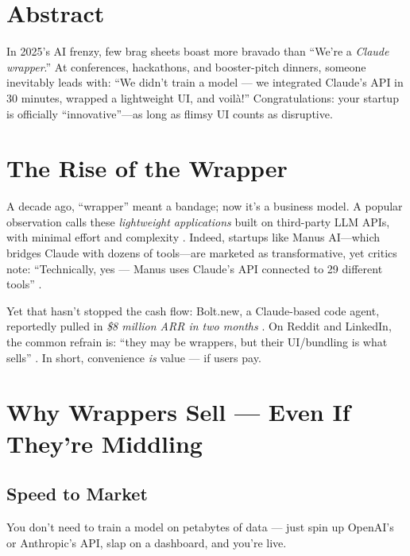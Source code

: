 




\section*{Abstract}
In 2025's AI frenzy, few brag sheets boast more bravado than ``We're a \emph{Claude wrapper}.''
At conferences, hackathons, and booster-pitch dinners, someone inevitably leads with:
``We didn't train a model --- we integrated Claude's API in 30 minutes, wrapped a lightweight UI, and voilà!''
Congratulations: your startup is officially ``innovative''---as long as flimsy UI counts as disruptive.

\section{The Rise of the Wrapper}

A decade ago, ``wrapper'' meant a bandage; now it's a business model.
A popular observation calls these \emph{lightweight applications} built on third-party LLM APIs, with minimal effort and complexity \cite{olivas2025linkedin}.
Indeed, startups like Manus AI---which bridges Claude with dozens of tools---are marketed as transformative,
yet critics note: ``Technically, yes --- Manus uses Claude's API connected to 29 different tools'' \cite{goldie2025manus}.

Yet that hasn't stopped the cash flow: Bolt.new, a Claude-based code agent, reportedly pulled in \emph{\$8 million ARR in two months} \cite{latent2025bolt}.
On Reddit and LinkedIn, the common refrain is: ``they may be wrappers, but their UI/bundling is what sells'' \cite{krunal2025hype}.
In short, convenience \emph{is} value --- if users pay.

\section{Why Wrappers Sell --- Even If They're Middling}

\subsection{Speed to Market}
You don't need to train a model on petabytes of data --- just spin up OpenAI's or Anthropic's API, slap on a dashboard, and you're live.

